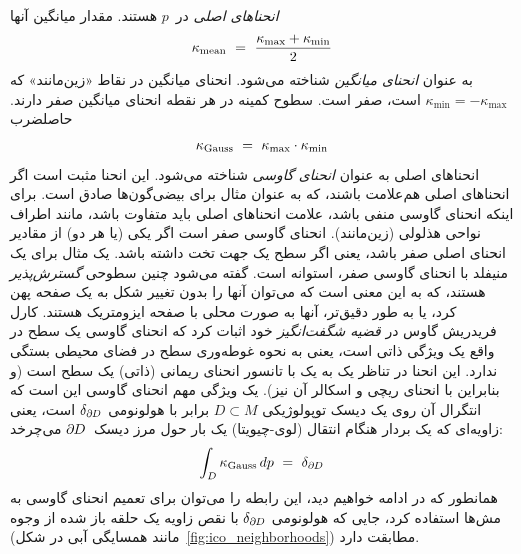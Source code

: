 \emph{انحناهای اصلی} در~$p$ هستند.
مقدار میانگین آنها
\begin{align}\label{eq:mean_curvature}
    \kappa_{\textup{mean}} \ =\ \frac{\kappa_{\max}+\kappa_{\min}}{2}
\end{align}
به عنوان \emph{انحنای میانگین} شناخته می‌شود.
انحنای میانگین در نقاط «زین‌مانند» که $\kappa_{\min} = -\kappa_{\max}$ است، صفر است.
سطوح کمینه در هر نقطه انحنای میانگین صفر دارند.
حاصلضرب
\begin{align}
    \kappa_{\textup{Gauss}}\ =\ \kappa_{\max} \cdot \kappa_{\min}
\end{align}
انحناهای اصلی به عنوان \emph{انحنای گاوسی} شناخته می‌شود.
این انحنا مثبت است اگر انحناهای اصلی هم‌علامت باشند، که به عنوان مثال برای بیضی‌گون‌ها صادق است.
برای اینکه انحنای گاوسی منفی باشد، علامت انحناهای اصلی باید متفاوت باشد، مانند اطراف نواحی هذلولی (زین‌مانند).
انحنای گاوسی صفر است اگر یکی (یا هر دو) از مقادیر انحنای اصلی صفر باشد، یعنی اگر سطح یک جهت تخت داشته باشد.
یک مثال برای یک منیفلد با انحنای گاوسی صفر، استوانه است.
گفته می‌شود چنین سطوحی \emph{گسترش‌پذیر} هستند، که به این معنی است که می‌توان آنها را بدون تغییر شکل به یک صفحه پهن کرد، یا به طور دقیق‌تر، آنها به صورت محلی با صفحه ایزومتریک هستند.
کارل فریدریش گاوس در \emph{قضیه شگفت‌انگیز} خود اثبات کرد که انحنای گاوسی یک سطح در واقع یک ویژگی ذاتی است، یعنی به نحوه غوطه‌وری سطح در فضای محیطی بستگی ندارد.
این انحنا در تناظر یک به یک با تانسور انحنای ریمانی (ذاتی) یک سطح است (و بنابراین با انحنای ریچی و اسکالر آن نیز).
یک ویژگی مهم انحنای گاوسی این است که انتگرال آن روی یک دیسک توپولوژیکی $D \subset M$ برابر با هولونومی $\delta_{\partial\mkern-1mu D}$ است، یعنی زاویه‌ای که یک بردار هنگام انتقال (لوی-چیویتا) یک بار حول مرز دیسک~$\partial\mkern-1mu D$ می‌چرخد:
\begin{align}\label{eq:gauss_curvature_holonomy_smooth}
    \int_{D} \kappa_{\textup{Gauss}}\, dp\ =\ \delta_{\partial\mkern-1mu D}
\end{align}
همانطور که در ادامه خواهیم دید، این رابطه را می‌توان برای تعمیم انحنای گاوسی به مش‌ها استفاده کرد، جایی که هولونومی $\delta_{\partial\mkern-1mu D}$ با نقص زاویه یک حلقه باز شده از وجوه (مانند همسایگی آبی در شکل~\ref{fig:ico_neighborhoods}) مطابقت دارد.

